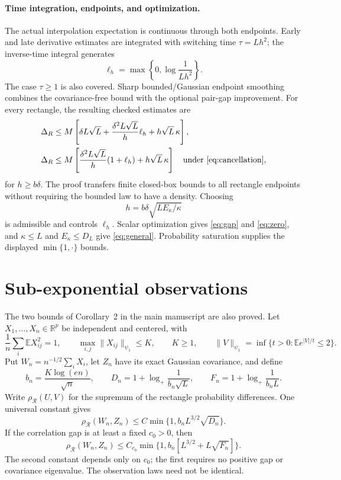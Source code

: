 \documentclass[11pt]{article}
\newcommand{\R}{\mathbb R}
\newcommand{\E}{\mathbb E}
\begin{document}
\paragraph{Time integration, endpoints, and optimization.}
The actual interpolation expectation is continuous through both
endpoints. Early and late derivative estimates are integrated with
switching time $\tau=Lh^2$; the inverse-time integral generates
\[
 \ell_h=\max\left\{0,\log\frac1{Lh^2}\right\}.
\]
The case $\tau\ge1$ is also covered. Sharp bounded/Gaussian endpoint
smoothing combines the covariance-free bound with the optional pair-gap
improvement. For every rectangle, the resulting checked estimates are
\begin{align}
 \Delta_R&\le M\left[\delta L\sqrt L+
       \frac{\delta^2L\sqrt L}{h}\ell_h+h\sqrt L\,\kappa\right],
       \label{eq:variational}\\
 \Delta_R&\le M\left[
       \frac{\delta^2L\sqrt L}{h}(1+\ell_h)+h\sqrt L\,\kappa\right]
       \quad\text{under \eqref{eq:cancellation}},\label{eq:variational-zero}
\end{align}
for $h\ge b\delta$. The proof transfers finite closed-box bounds to
all rectangle endpoints without requiring the bounded law to have a
density. Choosing
\[
 h=b\delta\sqrt{LE_\kappa/\kappa}
\]
is admissible and controls $\ell_h$. Scalar optimization gives
\eqref{eq:gap} and \eqref{eq:zero}, and $\kappa\le L$ and
$E_\kappa\le D_L$ give \eqref{eq:general}. Probability saturation
supplies the displayed $\min\{1,\cdot\}$ bounds.

\section{Sub-exponential observations}
The two bounds of Corollary~2 in the main manuscript are also proved.
Let $X_1,\ldots,X_n\in\R^p$ be independent and centered, with
\[
 \frac1n\sum_i\E X_{ij}^2=1,\qquad
 \max_{i,j}\|X_{ij}\|_{\psi_1}\le K,\qquad K\ge1,
 \qquad \|V\|_{\psi_1}=\inf\{t>0:\E e^{|V|/t}\le2\}.
\]
Put $W_n=n^{-1/2}\sum_iX_i$, let $Z_n$ have its exact Gaussian
covariance, and define
\[
 b_n=\frac{K\log(en)}{\sqrt n},\qquad
 D_n=1+\log_+\frac1{b_n\sqrt L},\qquad
 F_n=1+\log_+\frac1{b_nL}.
\]
Write $\rho_{\mathcal R}(U,V)$ for the supremum of the rectangle
probability differences. One universal constant gives
\begin{equation}
 \rho_{\mathcal R}(W_n,Z_n)
 \le C\min\{1,b_nL^{3/2}\sqrt{D_n}\}.
 \label{eq:tail-general}
\end{equation}
If the correlation gap is at least a fixed $c_0>0$, then
\begin{equation}
 \rho_{\mathcal R}(W_n,Z_n)
 \le C_{c_0}\min\{1,b_n[L^{3/2}+L\sqrt{F_n}]\}.
 \label{eq:tail-gap}
\end{equation}
The second constant depends only on $c_0$; the first requires no positive
gap or covariance eigenvalue. The observation laws need not be identical.
\end{document}

